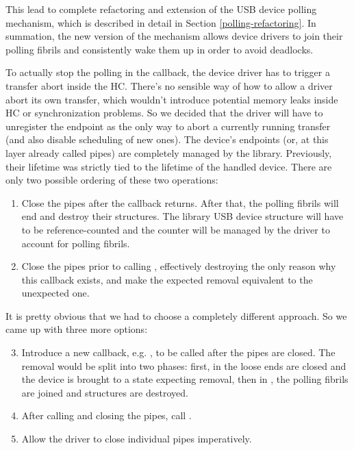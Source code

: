 This lead to complete refactoring and extension of the USB device polling
mechanism, which is described in detail in Section \ref{polling-refactoring}.
In summation, the new version of the mechanism allows device drivers to join
their polling fibrils and consistently wake them up in order to avoid deadlocks.

To actually stop the polling in the  callback, the device
driver has to trigger a transfer abort inside the HC. There's no sensible way
of how to allow a driver abort its own transfer, which wouldn't introduce
potential memory leaks inside HC or synchronization problems. So we decided
that the driver will have to unregister the endpoint as the only way to abort
a currently running transfer (and also disable scheduling of new ones). The
device's endpoints (or, at this layer already called pipes) are completely
managed by the  library. Previously, their lifetime was strictly
tied to the lifetime of the handled device. There are only two possible
ordering of these two operations:

\begin{enumerate}
	\item Close the pipes after the  callback returns.
		After that, the polling fibrils will end and destroy their structures.
		The library USB device structure will have to be reference-counted and
		the counter will be managed by the driver to account for polling
		fibrils.

	\item Close the pipes prior to calling , effectively
		destroying the only reason why this callback exists, and make the
		expected removal equivalent to the unexpected one.
\end{enumerate}

\noindent It is pretty obvious that we had to choose a completely different approach. So
we came up with three more options:

\begin{enumerate}
\setcounter{enumi}{2}
	\item Introduce a new callback, e.g. , to be called
		after the pipes are closed. The removal would be split into two phases:
		first, in  the loose ends are closed and the
		device is brought to a state expecting removal, then in
		, the polling fibrils are joined and structures
		are destroyed.

	\item After calling  and closing the pipes, call
		.

	\item Allow the driver to close individual pipes imperatively.
\end{enumerate}

